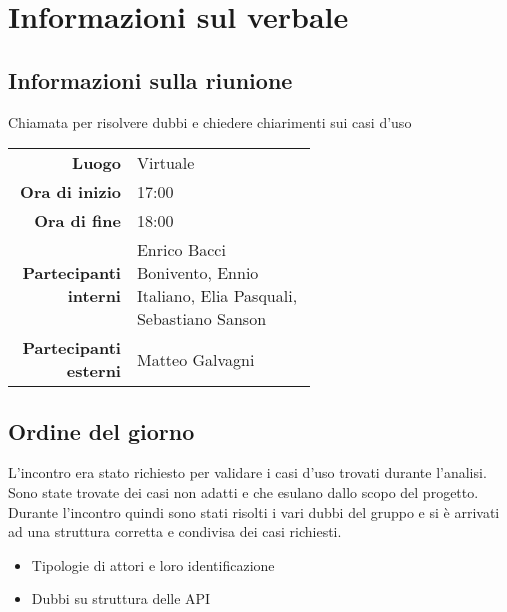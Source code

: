 \section{Informazioni sul verbale}

\subsection{Informazioni sulla riunione}
Chiamata per risolvere dubbi e chiedere chiarimenti sui casi d'uso

\begin{center}
	\begin{tabular}{r|p{0.6\linewidth}}
		\toprule
		\textbf{Luogo} & Virtuale \\
		\textbf{Ora di inizio} & 17:00 \\
		\textbf{Ora di fine} & 18:00 \\
		\textbf{Partecipanti interni} & Enrico Bacci Bonivento, Ennio Italiano, Elia Pasquali, Sebastiano Sanson \\
		\textbf{Partecipanti esterni} & Matteo Galvagni
	\end{tabular}
\end{center}

\medskip

\subsection{Ordine del giorno}

L'incontro era stato richiesto per validare i casi d'uso trovati durante l'analisi. Sono state trovate dei casi non adatti e che esulano dallo scopo del progetto. Durante l'incontro quindi sono stati risolti i vari dubbi del gruppo e si è arrivati ad una struttura corretta e condivisa dei casi richiesti.

\begin{itemize}
	\item Tipologie di attori e loro identificazione
	\item Dubbi su struttura delle API
\end{itemize}
